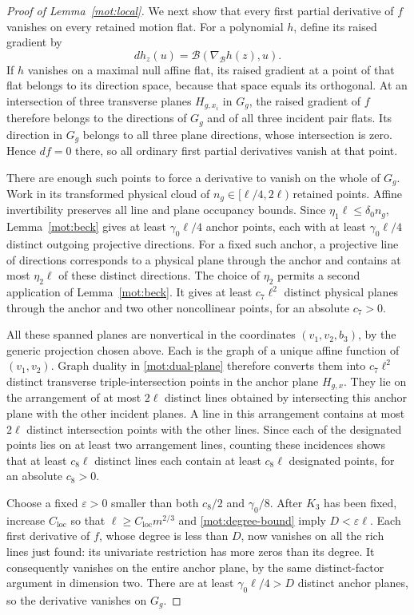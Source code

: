 \begin{proof}[Proof of Lemma~\ref{mot:local}]
We next show that every first partial derivative of \(f\) vanishes
on every retained motion flat.  For a polynomial \(h\), define its
raised gradient by
\[
 dh_z(u)=\mathcal B(\nabla_{\mathcal B}h(z),u).
\]
If \(h\) vanishes on a maximal null affine flat, its raised
gradient at a point of that flat belongs to its direction space,
because that space equals its orthogonal.  At an intersection of
three transverse planes \(H_{g,x_i}\) in \(G_g\), the raised
gradient of \(f\) therefore belongs to the directions of
\(G_g\) and of all three incident pair flats.  Its direction in
\(G_g\) belongs to all three plane directions, whose intersection
is zero.  Hence \(df=0\) there, so all ordinary first partial
derivatives vanish at that point.

There are enough such points to force a derivative to vanish on the
whole of \(G_g\).  Work in its transformed physical cloud of
\(n_g\in[\ell/4,2\ell)\) retained points.  Affine invertibility
preserves all line and plane occupancy bounds.  Since
\(\eta_1\ell\le\delta_0 n_g\), Lemma~\ref{mot:beck} gives at
least \(\gamma_0\ell/4\) anchor points, each with at least
\(\gamma_0\ell/4\) distinct outgoing projective directions.
For a fixed such anchor, a projective line of directions corresponds
to a physical plane through the anchor and contains at most
\(\eta_2\ell\) of these distinct directions.  The choice of
\(\eta_2\) permits a second application of Lemma~\ref{mot:beck}.
It gives at least \(c_7\ell^2\) distinct physical planes through
the anchor and two other noncollinear points, for an absolute
\(c_7>0\).

All these spanned planes are nonvertical in the coordinates
\((v_1,v_2,b_3)\), by the generic projection chosen above.  Each
is the graph of a unique affine function of \((v_1,v_2)\).
Graph duality in \eqref{mot:dual-plane} therefore converts them
into \(c_7\ell^2\) distinct transverse triple-intersection points
in the anchor plane \(H_{g,x}\).  They lie on the arrangement of
at most \(2\ell\) distinct lines obtained by intersecting this
anchor plane with the other incident planes.  A line in this
arrangement contains at most \(2\ell\) distinct intersection
points with the other lines.  Since each of the designated points
lies on at least two arrangement lines, counting these incidences
shows that at least \(c_8\ell\) distinct lines each contain at
least \(c_8\ell\) designated points, for an absolute \(c_8>0\).

Choose a fixed \(\varepsilon>0\) smaller than both
\(c_8/2\) and \(\gamma_0/8\).  After \(K_3\) has been fixed,
increase \(C_{\mathrm{loc}}\) so that
\(\ell\ge C_{\mathrm{loc}}m^{2/3}\) and
\eqref{mot:degree-bound} imply \(D<\varepsilon\ell\).
Each first derivative of \(f\), whose degree is less than \(D\),
now vanishes on all the rich lines just found: its univariate
restriction has more zeros than its degree.  It consequently
vanishes on the entire anchor plane, by the same distinct-factor
argument in dimension two.  There are at least
\(\gamma_0\ell/4>D\) distinct anchor planes, so the derivative
vanishes on \(G_g\).


\end{proof}
